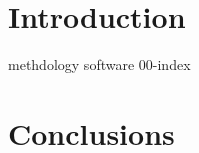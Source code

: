 \documentclass[11pt]{report}
\begin{document}

\makecover%


\clearpage
{}
\settableofcontents%
\tableofcontents


\clearpage
\setlistoffigures%
\listoffigures


\clearpage
\setlistoftables%
\listoftables





\chapter{Introduction}
\label{chap:introduction}


{methdology}
{software}
{00-index}

\chapter{Conclusions}
\label{chap:conclusions}



\clearpage




\appendix






\makedisclaimer%
\end{document}
